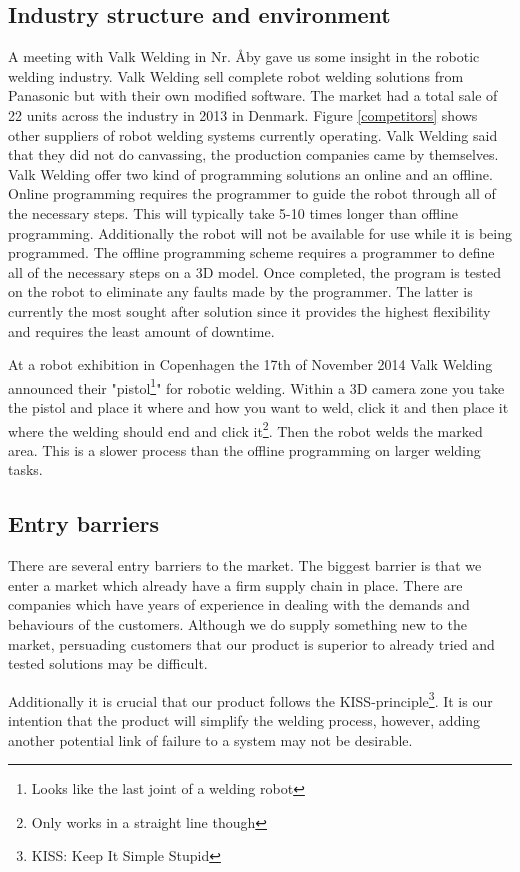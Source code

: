 \subsection{Industry structure and environment}
\label{ind.struc}
A meeting with Valk Welding in Nr. Åby\cite{valk_welding_summary} gave us some insight in the robotic welding industry. Valk Welding sell complete robot welding solutions from Panasonic but with their own modified software. The market had a total sale of 22 units across the industry in 2013 in Denmark. Figure \ref{competitors} shows other suppliers of robot welding systems currently operating. Valk Welding said that they did not do canvassing, the production companies came by themselves. Valk Welding offer two kind of programming solutions an online and an offline. 
Online programming requires the programmer to guide the robot through all of the necessary steps. This will typically take 5-10 times longer than offline programming. Additionally the robot will not be available for use while it is being programmed. The offline programming scheme requires a programmer to define all of the necessary steps on a 3D model. Once completed, the program is tested on the robot to eliminate any faults made by the programmer. The latter is currently the most sought after solution since it provides the highest flexibility and requires the least amount of downtime.

At a robot exhibition in Copenhagen the 17th of November 2014 Valk Welding announced their "pistol\footnote{Looks like the last joint of a welding robot}" for robotic welding. Within a 3D camera zone you take the pistol and place it where and how you want to weld, click it and then place it where the welding should end and click it\footnote{Only works in a straight line though}. Then the robot welds the marked area. This is a slower process than the offline programming on larger welding tasks.
\subsection{Entry barriers}
There are several entry barriers to the market. The biggest barrier is that we enter a market which already have a firm supply chain in place. There are companies which have years of experience in dealing with the demands and behaviours of the customers. Although we do supply something new to the market, persuading customers that our product is superior to already tried and tested solutions may be difficult.

Additionally it is crucial that our product follows the KISS-principle\footnote{KISS: Keep It Simple Stupid}. It is our intention that the product will simplify the welding process, however, adding another potential link of failure to a system may not be desirable.

